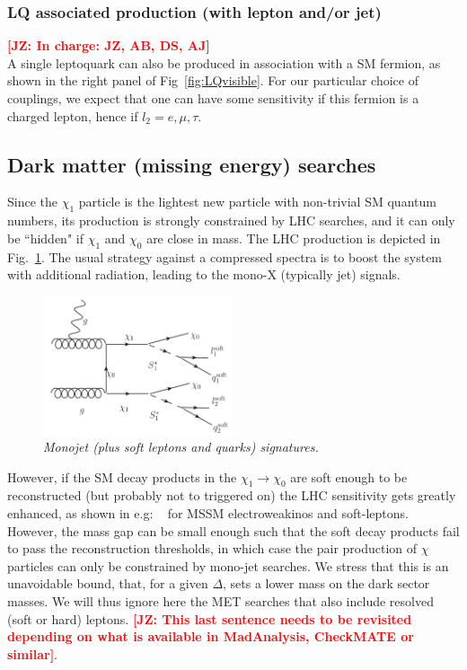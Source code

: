 \documentclass[11pt]{cernrep}
\def\JZ#1{{\bf  \textcolor{red}{[JZ: {#1}]}}}
\begin{document}
\subsubsection{LQ associated production (with lepton and/or jet)}
\JZ{In charge: JZ, AB, DS, AJ} \\
A single leptoquark can also be produced in association with a SM fermion, as shown in the right panel of Fig~\ref{fig:LQvisible}. For our particular choice of couplings, we expect that one can have some sensitivity if this fermion is a charged lepton, hence if $l_2=e, \mu, \tau$.


\subsection{Dark matter (missing energy) searches}
\label{subsec:mjet}
Since the $\chi_1$ particle is the lightest new particle with non-trivial SM quantum numbers, its production is strongly constrained by LHC searches, and it can only be ``hidden" if $\chi_1$ and $\chi_0$ are close in mass. The LHC production is depicted in Fig.~\ref{fig:MonoJet}. The usual strategy against a compressed spectra is to boost the system with additional radiation, leading to the mono-X (typically jet) signals. 

 \begin{figure}[!htp]
  \centering
  \includegraphics[width=0.5\textwidth]{./figures/MonoJet.png} 
  \caption{\it Monojet (plus soft leptons and quarks) signatures.}
\label{fig:MonoJet}
\end{figure}

However, if the SM decay products in the $\chi_1 \to \chi_0$ are soft enough to be reconstructed (but probably not to triggered on) the LHC sensitivity gets greatly enhanced, as shown in e.g: ~\cite{Schwaller:2013baa} for MSSM electroweakinos and soft-leptons. However, the mass gap can be small enough such that the soft decay products fail to pass the reconstruction thresholds, in which case the pair production of $\chi$ particles can only be constrained by  mono-jet searches. We stress that this is an unavoidable bound, that, for a given $\Delta$, sets a lower mass on the dark sector masses. We will thus ignore here the MET searches that also include resolved (soft or hard) leptons. \JZ{This last sentence needs to be revisited depending on what is available in MadAnalysis, CheckMATE or similar}.
\end{document}
